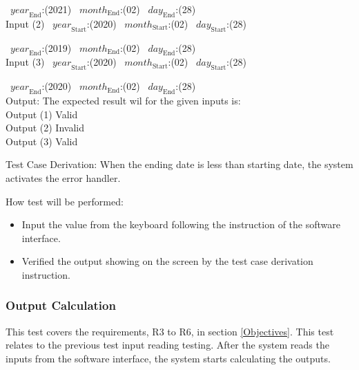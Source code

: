 \documentclass[12pt, titlepage]{article}
\begin{document}
\begin{enumerate}
~$\mathit{year}_\text{End}$:(2021)
~$\mathit{month}_\text{End}$:(02) ~$\mathit{day}_\text{End}$:(28)\\

Input (2) ~$\mathit{year}_\text{Start}$:(2020)
~$\mathit{month}_\text{Start}$:(02) ~$\mathit{day}_\text{Start}$:(28)

~$\mathit{year}_\text{End}$:(2019)
~$\mathit{month}_\text{End}$:(02) ~$\mathit{day}_\text{End}$:(28)\\

Input (3) ~$\mathit{year}_\text{Start}$:(2020)
~$\mathit{month}_\text{Start}$:(02) ~$\mathit{day}_\text{Start}$:(28)

~$\mathit{year}_\text{End}$:(2020)
~$\mathit{month}_\text{End}$:(02) ~$\mathit{day}_\text{End}$:(28)\\

Output: The expected result wil for the given inputs is:\\ 
Output (1) Valid\\ 
Output (2) Invalid\\
Output (3) Valid\\ 


Test Case Derivation: When the ending date is less than starting date, the system
activates the error handler. \\ 


How test will be performed: 

\begin{itemize} 
\item Input the value from the keyboard following the instruction of the
software interface. 
\item Verified the output showing on the screen by the test case derivation
instruction.
\end{itemize} 
\end{enumerate}

\subsubsection{Output Calculation}

This test covers the requirements, R3 to R6, in section \ref{Objectives}.
This test relates to the previous test input reading testing. After the 
system reads the inputs from the software interface, the system starts
calculating the outputs.
\end{document}
